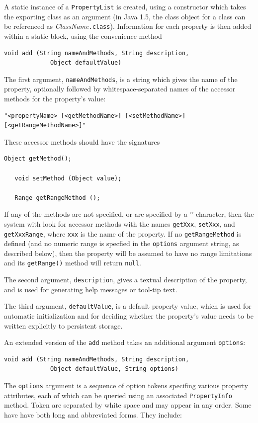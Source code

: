 \documentclass{article}
\begin{document}
A static instance of a {\tt PropertyList} is created, using a
constructor which takes the exporting class as an argument (in Java
1.5, the class object for a class can be referenced as 
{\it ClassName}{\tt .class}). Information for each property is
then added within a static block, using the convenience method
\begin{lstlisting}[]
   void add (String nameAndMethods, String description, 
             Object defaultValue)    
\end{lstlisting}
The first argument, {\tt nameAndMethods}, is a string which gives the
name of the property, optionally followed by
whitespace-separated names of the accessor methods for
the property's value:
\begin{lstlisting}[]
   "<propertyName> [<getMethodName>] [<setMethodName>] [<getRangeMethodName>]"    
\end{lstlisting}
These accessor methods should have the
signatures
\begin{lstlisting}[]
   Object getMethod();

   void setMethod (Object value);

   Range getRangeMethod ();
\end{lstlisting}

If any of the methods are not specified, or are specified by a '{\tt *}'
character, then the system with look for accessor methods with the
names {\tt getXxx}, {\tt setXxx}, and {\tt getXxxRange}, where {\tt xxx} is the name
of the property. If no {\tt getRangeMethod} is defined (and no numeric
range is specfied in the {\tt options} argument string, as described
below), then the property will be assumed to have no range limitations
and its {\tt getRange()} method will return {\tt null}.

The second argument, {\tt description}, gives a textual description of
the property, and is used for generating help messages or tool-tip
text.

The third argument, {\tt defaultValue}, is a default property value,
which is used for automatic initialization and for deciding whether
the property's value needs to be written explicitly to persistent
storage.

An extended version of the {\tt add} method takes an additional
argument {\tt options}:
\begin{lstlisting}[]
   void add (String nameAndMethods, String description, 
             Object defaultValue, String options)
\end{lstlisting}
The {\tt options} argument is a sequence of option tokens specifing
various property attributes, each of which can be queried using an
associated {\tt PropertyInfo} method.  Token are separated by white
space and may appear in any order. Some have have both long and
abbreviated forms.  They include:
\end{document}
